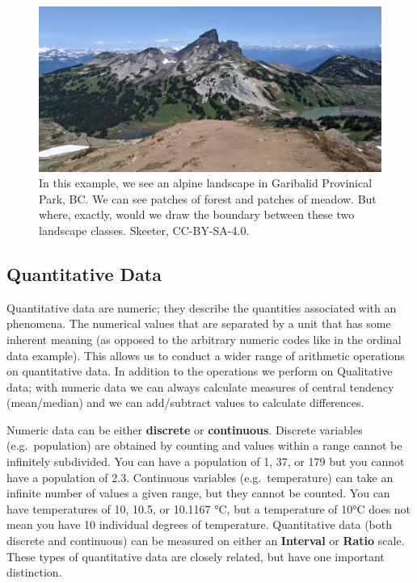\documentclass[
]{book}
\begin{document}
\begin{figure}
\includegraphics[width=0.75\linewidth]{images/03-fuzzy} \caption{In this example, we see an alpine landscape in Garibalid Provinical Park, BC.  We can see patches of forest and patches of meadow.  But where, exactly, would we draw the boundary between these two landscape classes. Skeeter, CC-BY-SA-4.0.}\label{fig:3-fuzzy}
\end{figure}

\hypertarget{quantitative-data}{%
\subsection{Quantitative Data}\label{quantitative-data}}

Quantitative data are numeric; they describe the quantities associated with an phenomena. The numerical values that are separated by a unit that has some inherent meaning (as opposed to the arbitrary numeric codes like in the ordinal data example). This allows us to conduct a wider range of arithmetic operations on quantitative data. In addition to the operations we perform on Qualitative data; with numeric data we can always calculate measures of central tendency (mean/median) and we can add/subtract values to calculate differences.

Numeric data can be either \textbf{discrete} or \textbf{continuous}. Discrete variables (e.g.~population) are obtained by counting and values within a range cannot be infinitely subdivided. You can have a population of 1, 37, or 179 but you cannot have a population of 2.3. Continuous variables (e.g.~temperature) can take an infinite number of values a given range, but they cannot be counted. You can have temperatures of 10, 10.5, or 10.1167 °C, but a temperature of 10°C does not mean you have 10 individual degrees of temperature. Quantitative data (both discrete and continuous) can be measured on either an \textbf{Interval} or \textbf{Ratio} scale. These types of quantitative data are closely related, but have one important distinction.
\end{document}
